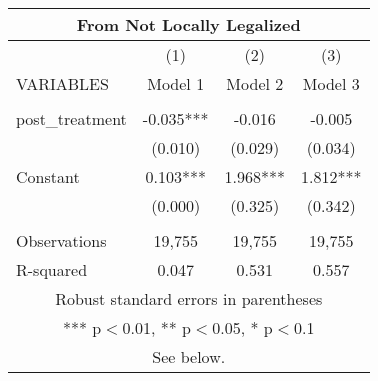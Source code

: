 \begin{tabular}{lccc}
\multicolumn{4}{c}{From Not Locally Legalized} \\ \hline
 & (1) & (2) & (3) \\
VARIABLES & Model 1 & Model 2 & Model 3 \\ \hline
 &  &  &  \\
post\_treatment & -0.035*** & -0.016 & -0.005 \\
 & (0.010) & (0.029) & (0.034) \\
Constant & 0.103*** & 1.968*** & 1.812*** \\
 & (0.000) & (0.325) & (0.342) \\
 &  &  &  \\
Observations & 19,755 & 19,755 & 19,755 \\
 R-squared & 0.047 & 0.531 & 0.557 \\ \hline
\multicolumn{4}{c}{ Robust standard errors in parentheses} \\
\multicolumn{4}{c}{ *** p$<$0.01, ** p$<$0.05, * p$<$0.1} \\
\multicolumn{4}{c}{ See below.} \\
\end{tabular}
